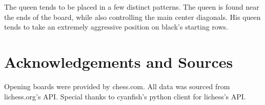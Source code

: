 \documentclass[reprint,
 amsmath,amssymb,nobibnotes,
 aps, floatfix]{revtex4-1}
\begin{document}
The queen tends to be placed in a few distinct patterns. The queen is found near the ends of the board, while also controlling the main center diagonals. His queen tends to take an extremely aggressive position on black's starting rows.


\cleardoublepage
\section{\label{sec:level5} Acknowledgements and Sources}
Opening boards were provided by chess.com. All data was sourced from lichess.org's API. Special thanks to cyanfish's python client for lichess's API.


\end{document}

